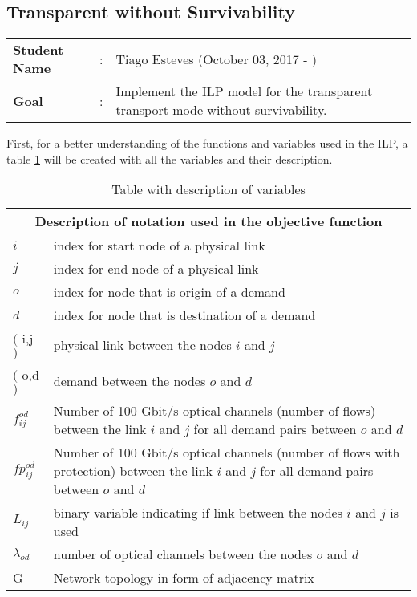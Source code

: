 \clearpage

\subsection{Transparent without Survivability}\label{ILP_Transp_Survivability}
\begin{tcolorbox}	
\begin{tabular}{p{2.75cm} p{0.2cm} p{10.5cm}} 	
\textbf{Student Name}  &:& Tiago Esteves    (October 03, 2017 - )\\
\textbf{Goal}          &:& Implement the ILP model for the transparent transport mode without survivability.
\end{tabular}
\end{tcolorbox}
\vspace{11pt}

First, for a better understanding of the functions and variables used in the ILP, a table \ref{description_transp} will be created with all the variables and their description.

\begin{table}[h!]
\centering
\begin{tabular}{ |p{1cm}||p{13cm}|}
 \hline
 \multicolumn{2}{|c|}{Description of notation used in the objective function} \\
 \hline
 \hline
 $i$ & index for start node of a physical link \\
 $j$ & index for end node of a physical link \\
 $o$ & index for node that is origin of a demand \\
 $d$ & index for node that is destination of a demand \\
 $($ i,j $)$ & physical link between the nodes $i$ and $j$ \\
 $($ o,d $)$ & demand between the nodes $o$ and $d$ \\
 $f_{ij}^{od}$ & Number of 100 Gbit/s optical channels (number of flows) between the link $i$ and $j$ for all demand pairs between $o$ and $d$ \\
 $fp_{ij}^{od}$ & Number of 100 Gbit/s optical channels (number of flows with protection) between the link $i$ and $j$ for all demand pairs between $o$ and $d$ \\
 $L_{ij}$ & binary variable indicating if link between the nodes $i$ and $j$ is used \\
 $\lambda_{od}$ & number of optical channels between the nodes $o$ and $d$\\
 G & Network topology in form of adjacency matrix \\
 \hline
\end{tabular}
\caption{Table with description of variables}
\label{description_transp}
\end{table}


